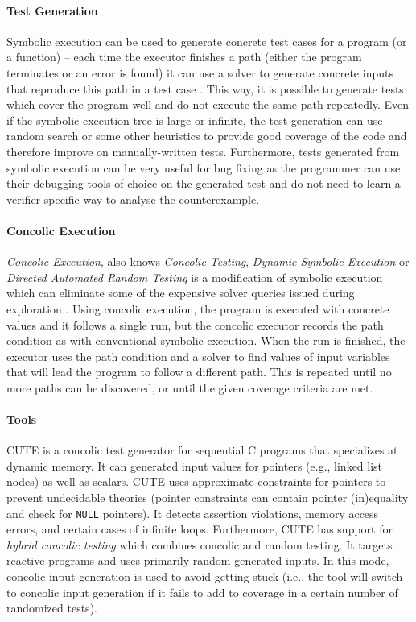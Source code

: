 \paragraph{Test Generation}

Symbolic execution can be used to generate concrete test cases for a program (or a function) -- each time the executor finishes a path (either the program terminates or an error is found) it can use a solver to generate concrete inputs that reproduce this path in a test case .
This way, it is possible to generate tests which cover the program well and do not execute the same path repeatedly.
Even if the symbolic execution tree is large or infinite, the test generation can use random search or some other heuristics to provide good coverage of the code and therefore improve on manually-written tests.
Furthermore, tests generated from symbolic execution can be very useful for bug fixing as the programmer can use their debugging tools of choice on the generated test and do not need to learn a verifier-specific way to analyse the counterexample.

\paragraph{Concolic Execution}

\emph{Concolic Execution}, also knows \emph{Concolic Testing}, \emph{Dynamic Symbolic Execution} or \emph{Directed Automated Random Testing} is a modification of symbolic execution which can eliminate some of the expensive solver queries issued during exploration .
Using concolic execution, the program is executed with concrete values and it follows a single run, but the concolic executor records the path condition as with conventional symbolic execution.
When the run is finished, the executor uses the path condition and a solver to find values of input variables that will lead the program to follow a different path.
This is repeated until no more paths can be discovered, or until the given coverage criteria are met.

\paragraph{Tools}

CUTE  is a concolic test generator for sequential C programs that specializes at dynamic memory.
It can generated input values for pointers (e.g., linked list nodes) as well as scalars.
CUTE uses approximate constraints for pointers to prevent undecidable theories (pointer constraints can contain pointer (in)equality and check for \texttt{NULL} pointers).
It detects assertion violations, memory access errors, and certain cases of infinite loops.
Furthermore, CUTE has support for \emph{hybrid concolic testing} which combines concolic and random testing.
It targets reactive programs and uses primarily random-generated inputs.
In this mode, concolic input generation is used to avoid getting stuck (i.e., the tool will switch to concolic input generation if it fails to add to coverage in a certain number of randomized tests).

